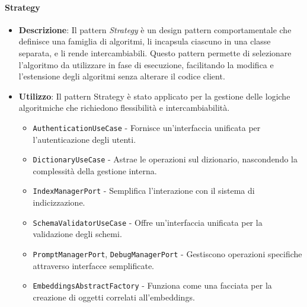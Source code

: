 \paragraph{Strategy}
\begin{itemize}
    \item \textbf{Descrizione}: Il pattern \textit{Strategy} è un design pattern comportamentale che definisce una famiglia di algoritmi, li incapsula ciascuno in una classe separata, e li rende intercambiabili. Questo pattern permette di selezionare l'algoritmo da utilizzare in fase di esecuzione, facilitando la modifica e l'estensione degli algoritmi senza alterare il codice client.
    \item \textbf{Utilizzo}: Il pattern Strategy è stato applicato per la gestione delle logiche algoritmiche che richiedono flessibilità e intercambiabilità.
    \begin{itemize}
        \item \texttt{AuthenticationUseCase} - Fornisce un'interfaccia unificata per l'autenticazione degli utenti.
        \item \texttt{DictionaryUseCase} - Astrae le operazioni sul dizionario, nascondendo la complessità della gestione interna.
        \item \texttt{IndexManagerPort} - Semplifica l'interazione con il sistema di indicizzazione.
        \item \texttt{SchemaValidatorUseCase} - Offre un'interfaccia unificata per la validazione degli schemi.
        \item \texttt{PromptManagerPort}, \texttt{DebugManagerPort} - Gestiscono operazioni specifiche attraverso interfacce semplificate.
        \item \texttt{EmbeddingsAbstractFactory} - Funziona come una facciata per la creazione di oggetti correlati all'embeddings.
    \end{itemize}
\end{itemize}

